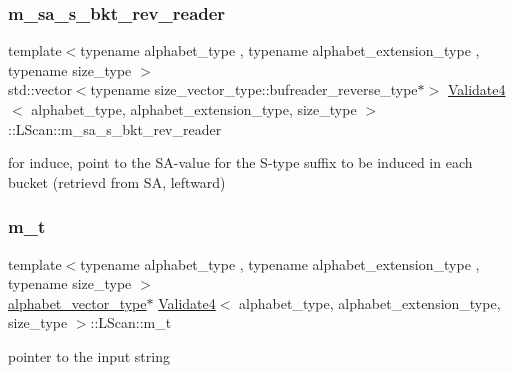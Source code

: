 \mbox{\label{struct_validate4_1_1_l_scan_a49a126aeb7f9b315fc49b0fc5da01cb2}} 
\subsubsection{\texorpdfstring{m\+\_\+sa\+\_\+s\+\_\+bkt\+\_\+rev\+\_\+reader}{m\_sa\_s\_bkt\_rev\_reader}}
{\footnotesize\ttfamily template$<$typename alphabet\+\_\+type , typename alphabet\+\_\+extension\+\_\+type , typename size\+\_\+type $>$ \\
std\+::vector$<$typename size\+\_\+vector\+\_\+type\+::bufreader\+\_\+reverse\+\_\+type$\ast$$>$ \hyperlink{class_validate4}{Validate4}$<$ alphabet\+\_\+type, alphabet\+\_\+extension\+\_\+type, size\+\_\+type $>$\+::L\+Scan\+::m\+\_\+sa\+\_\+s\+\_\+bkt\+\_\+rev\+\_\+reader\hspace{0.3cm}{\ttfamily [private]}}



for induce, point to the S\+A-\/value for the S-\/type suffix to be induced in each bucket (retrievd from SA, leftward) 

\mbox{\label{struct_validate4_1_1_l_scan_a3f7a5fe6e603159503a161185eb38667}} 
\subsubsection{\texorpdfstring{m\+\_\+t}{m\_t}}
{\footnotesize\ttfamily template$<$typename alphabet\+\_\+type , typename alphabet\+\_\+extension\+\_\+type , typename size\+\_\+type $>$ \\
\hyperlink{class_validate4_a49c80b3d101be19542a4341c2387603a}{alphabet\+\_\+vector\+\_\+type}$\ast$ \hyperlink{class_validate4}{Validate4}$<$ alphabet\+\_\+type, alphabet\+\_\+extension\+\_\+type, size\+\_\+type $>$\+::L\+Scan\+::m\+\_\+t\hspace{0.3cm}{\ttfamily [private]}}



pointer to the input string 

